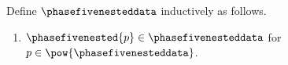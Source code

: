 \begin{datatype}\label{phase5_nested_data}
    Define $\phasefivenesteddata$ inductively as follows.
    \begin{enumerate}
        \item $\phasefivenested{p} \in \phasefivenesteddata$ for $p \in \pow{\phasefivenesteddata}$.
    \end{enumerate}
\end{datatype}
